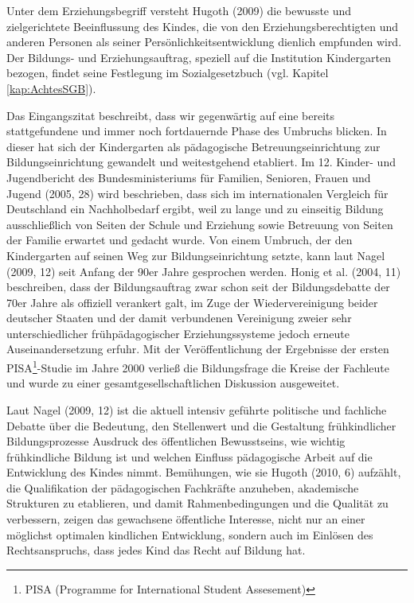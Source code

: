 Unter dem Erziehungsbegriff versteht Hugoth (2009) die bewusste und zielgerichtete Beeinflussung des Kindes, die von den Erziehungsberechtigten und anderen Personen als seiner Persönlichkeitsentwicklung dienlich empfunden wird. Der Bildungs- und Erziehungsauftrag, speziell auf die Institution Kindergarten bezogen, findet seine Festlegung im Sozialgesetzbuch (vgl. Kapitel \ref{kap:AchtesSGB}). 

Das Eingangszitat beschreibt, dass wir gegenwärtig auf eine bereits stattgefundene und immer noch fortdauernde Phase des Umbruchs blicken. In dieser hat sich der Kindergarten als pädagogische Betreuungseinrichtung zur Bildungseinrichtung gewandelt und weitestgehend etabliert. Im 12. Kinder- und Jugendbericht des Bundesministeriums für Familien, Senioren, Frauen und Jugend (2005, 28) wird beschrieben, dass sich im internationalen Vergleich für Deutschland ein Nachholbedarf ergibt, weil zu lange und zu einseitig Bildung ausschließlich von Seiten der Schule und Erziehung sowie Betreuung von Seiten der Familie erwartet und gedacht wurde. Von einem Umbruch, der den Kindergarten auf seinen Weg zur Bildungseinrichtung setzte, kann laut Nagel (2009, 12) seit Anfang der 90er Jahre gesprochen werden. Honig et al. (2004, 11) beschreiben, dass der Bildungsauftrag zwar schon seit der Bildungsdebatte der 70er Jahre als offiziell verankert galt, im Zuge der Wiedervereinigung beider deutscher Staaten und der damit verbundenen Vereinigung zweier sehr unterschiedlicher frühpädagogischer Erziehungssysteme jedoch erneute Auseinandersetzung erfuhr. Mit der Veröffentlichung der Ergebnisse der ersten PISA\footnote{PISA (Programme for International Student Assesement)}-Studie im Jahre 2000 verließ die Bildungsfrage die Kreise der Fachleute und wurde zu einer gesamtgesellschaftlichen Diskussion ausgeweitet.  

Laut Nagel (2009, 12) ist die aktuell intensiv geführte politische und fachliche Debatte über die Bedeutung, den Stellenwert und die Gestaltung frühkindlicher Bildungsprozesse Ausdruck des öffentlichen Bewusstseins, wie wichtig frühkindliche Bildung ist und welchen Einfluss pädagogische Arbeit auf die Entwicklung des Kindes nimmt. Bemühungen, wie sie Hugoth (2010, 6) aufzählt, die Qualifikation der pädagogischen Fachkräfte anzuheben, akademische Strukturen zu etablieren, und damit Rahmenbedingungen und die Qualität zu verbessern, zeigen das gewachsene öffentliche Interesse, nicht nur an einer möglichst optimalen kindlichen Entwicklung, sondern auch im Einlösen des Rechtsanspruchs, dass jedes Kind das Recht auf Bildung hat. 

